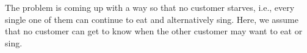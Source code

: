 The problem is coming up with a way so that no customer starves, i.\+e., every single one of them can continue to eat and alternatively sing. Here, we assume that no customer can get to know when the other customer may want to eat or sing. 